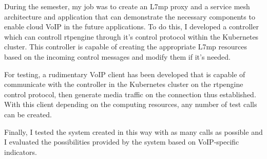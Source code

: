 During the semester, my job was to create an L7mp proxy and
a service mesh architecture and application that can demonstrate
the necessary components to enable cloud VoIP in the future
applications. To do this, I developed a controller which can controll rtpengine
through it's control protocol within the Kubernetes cluster.
This controller is capable of creating the appropriate L7mp resources based on the 
incoming control messages and modify them if it's needed.

For testing, a rudimentary VoIP client has been developed that is capable of
communicate with the controller in the Kubernetes cluster on the rtpengine control 
protocol,
then generate media traffic on the connection thus established. With this client
depending on the computing resources, any number of test calls can be created.

Finally, I tested the system created in this way with as many calls as possible and 
I evaluated the possibilities provided by the system based on VoIP-specific indicators. 

\vfill
\selectthesislanguage

\setcounter{romanPage}{\value{page}}
